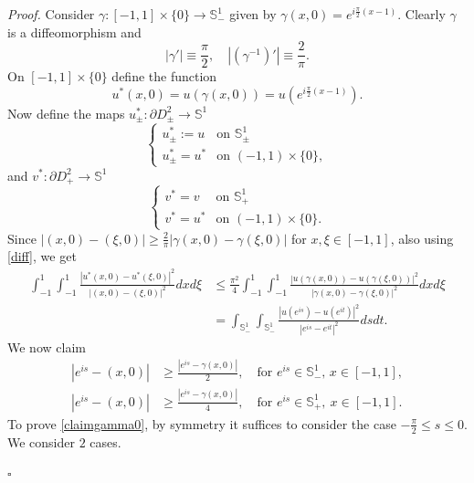 \documentclass[12pt, a4paper]{article}
\newenvironment{proof}{\noindent\emph{Proof.}}{\hfill$\square$\medskip}
\newcommand{\sph}{\mathbb{S}}
\renewcommand{\(}{\left(}
\renewcommand{\)}{\right)}
\begin{document}
\begin{proof}
Consider $\gamma:[-1,1]\times\{0\}\to\sph^1_-$ given by $\gamma(x,0)=e^{i\frac{\pi}{2}(x-1)}$. Clearly $\gamma$ is a diffeomorphism and
\begin{equation}\label{diff}
|\gamma'|\equiv\frac{\pi}{2},\quad |(\gamma^{-1})'|\equiv\frac{2}{\pi}.
\end{equation}
On $[-1,1]\times \{0\}$ define the function
$$u^*(x,0)=u(\gamma(x,0))=u(e^{i\frac{\pi}{2}(x-1)}).$$
Now define the maps $u^*_\pm :\partial D^2_\pm \to \sph^1$
\[
\begin{cases}
u^*_\pm :=u&\text{on }\sph^1_\pm\\
u^*_\pm =u^*&\text{on } (-1,1)\times \{0\},
\end{cases}
\]
and $v^*:\partial D^2_+\to \sph^1$
\[
\begin{cases}
v^*=v&\text{on }\sph^1_+\\
v^*=u^*&\text{on } (-1,1)\times \{0\}.
\end{cases}
\]
Since  $|(x,0)-(\xi,0)| \ge \frac{2}{\pi}|\gamma(x,0)-\gamma(\xi,0)|$   for $x, \xi\in [-1,1]$, also using \eqref{diff}, we get 
\begin{equation}\label{stimau*}
\begin{split}
\int_{-1}^{1}\int_{-1}^{1}\frac{|u^*(x,0)-u^*(\xi,0)|^2}{|(x,0)-(\xi,0)|^2}dxd\xi
&\le \frac{\pi^2}{4} \int_{-1}^{1}\int_{-1}^{1}\frac{|u(\gamma(x,0))-u(\gamma(\xi,0))|^2}{|\gamma(x,0)-\gamma(\xi,0)|^2}dxd\xi\\
&=  \int_{\sph^1_-}\int_{\sph^1_-}\frac{|u(e^{is})-u(e^{it})|^2}{|e^{is}-e^{it}|^2}dsdt.
\end{split}
\end{equation}
We now claim
\begin{align}\label{claimgamma0}
|e^{is}-(x,0)|&\ge \frac{|e^{is}-\gamma(x,0)|}{2},\quad \text{for }e^{is}\in \sph^1_-, \, x\in [-1,1],\\
\label{claimgamma}
|e^{is}-(x,0)|&\ge \frac{|e^{is}-\gamma(x,0)|}{4},\quad \text{for }e^{is}\in \sph^1_+,\ x\in [-1,1].
\end{align}
To prove \eqref{claimgamma0}, by symmetry it suffices to consider the case $-\frac{\pi}{2}\le s\le 0$. We consider $2$ cases.


\end{proof}
\end{document}
